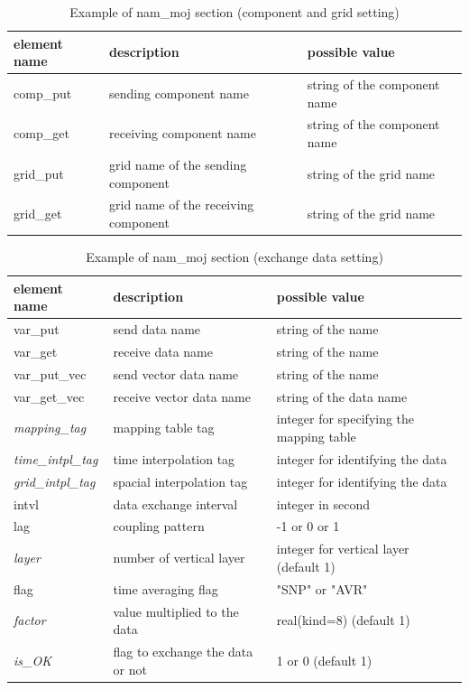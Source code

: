 \documentclass[11pt,a4paper]{report}
\begin{document}
\begin{table}[H]
\begin{center}
\caption{Example of nam\_moj section (component and grid setting)}
{\small
\label{table:nam_moj_comp}
\begin{tabular}{lll}
\hline\hline
 element name & description & possible value \\
\hline
 comp\_put & sending component name & string of the component name\\
 comp\_get & receiving component name & string of the component name\\
 grid\_put & grid name of the sending component & string of the grid name\\
 grid\_get & grid name of the receiving component & string of the grid name\\
\hline\hline
\end{tabular}
}
\end{center}
\end{table}

\begin{table}[H]
\begin{center}
\caption{Example of nam\_moj section (exchange data setting)}
{\small
\label{table:nam_moj_var}
\begin{tabular}{lll}
\hline\hline
 element name & description　& possible value \\
\hline
 var\_put & send data name & string of the name\\
 var\_get & receive data name & string of the name\\
 var\_put\_vec & send vector data name & string of the name\\
 var\_get\_vec & receive vector data name & string of the data name\\
 {\it mapping\_tag} & mapping table tag & integer for specifying the mapping table\\
 {\it time\_intpl\_tag} & time interpolation tag & integer for identifying the data\\
 {\it grid\_intpl\_tag} & spacial interpolation tag & integer for identifying the data\\
 intvl & data exchange interval & integer in second\\
 lag   & coupling pattern & -1 or 0 or 1\\
 {\it layer} & number of vertical layer & integer for vertical layer (default 1)\\
 flag  & time averaging flag & "SNP" or "AVR"\\
 {\it factor} & value multiplied to the data & real(kind=8) (default 1)\\
 {\it is\_OK} & flag to exchange the data or not & 1 or 0 (default 1)\\
\hline\hline
\end{tabular}
}
\end{center}
\end{table}
\end{document}
